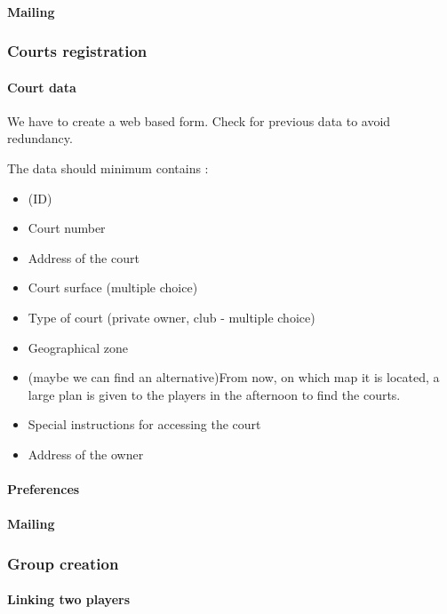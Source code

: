 \paragraph{Mailing}

\subsubsection{Courts registration}

\paragraph{Court data}

We have to create a web based form. Check for previous data to avoid
redundancy.

The data should minimum contains :

\begin{itemize}
    \item (ID)
    \item Court number
    \item Address of the court
    \item Court surface (multiple choice)
    \item Type of court (private owner, club - multiple choice)
    \item Geographical zone
    \item (maybe we can find an alternative)From now, on which map it is
        located, a large plan is given to the players in the afternoon
        to find the courts.
    \item Special instructions for accessing the court
    \item Address of the owner
\end{itemize}

\paragraph{Preferences}
\paragraph{Mailing}

\subsubsection{Group creation}

\paragraph{Linking two players}
